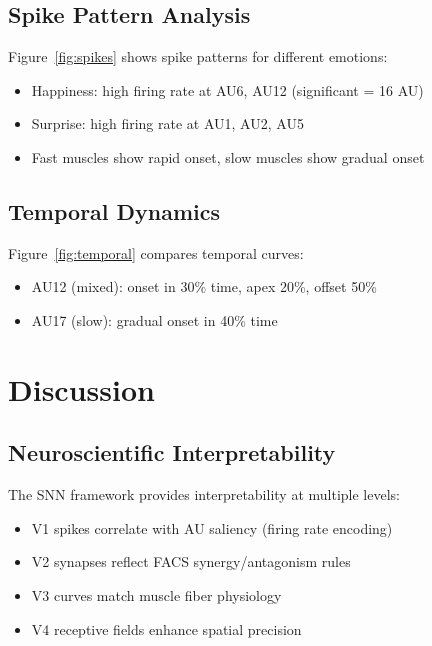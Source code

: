 \documentclass[preprint,12pt]{elsarticle}
\begin{document}
\subsection{Spike Pattern Analysis}

Figure~\ref{fig:spikes} shows spike patterns for different emotions:
\begin{itemize}
\item Happiness: high firing rate at AU6, AU12 (significant = 16 AU)
\item Surprise: high firing rate at AU1, AU2, AU5
\item Fast muscles show rapid onset, slow muscles show gradual onset
\end{itemize}

\subsection{Temporal Dynamics}

Figure~\ref{fig:temporal} compares temporal curves:
\begin{itemize}
\item AU12 (mixed): onset in 30\% time, apex 20\%, offset 50\%
\item AU17 (slow): gradual onset in 40\% time
\end{itemize}

\section{Discussion}
\label{sec:discussion}

\subsection{Neuroscientific Interpretability}

The SNN framework provides interpretability at multiple levels:
\begin{itemize}
\item V1 spikes correlate with AU saliency (firing rate encoding)
\item V2 synapses reflect FACS synergy/antagonism rules
\item V3 curves match muscle fiber physiology
\item V4 receptive fields enhance spatial precision
\end{itemize}
\end{document}
